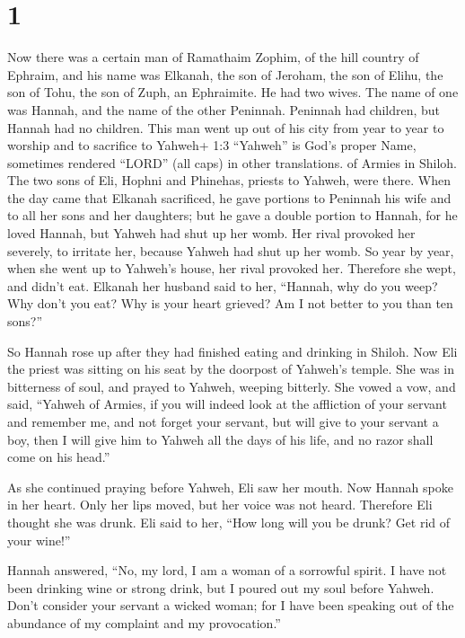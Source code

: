 \hypertarget{section}{%
\section{1}\label{section}}

 Now there was a certain man of Ramathaim Zophim, of the
hill country of Ephraim, and his name was Elkanah, the son of Jeroham,
the son of Elihu, the son of Tohu, the son of Zuph, an Ephraimite.
 He had two wives. The name of one was Hannah, and the name
of the other Peninnah. Peninnah had children, but Hannah had no
children.  This man went up out of his city from year to
year to worship and to sacrifice to Yahweh+ 1:3 ``Yahweh'' is God's
proper Name, sometimes rendered ``LORD'' (all caps) in other
translations. of Armies in Shiloh. The two sons of Eli, Hophni and
Phinehas, priests to Yahweh, were there.  When the day came
that Elkanah sacrificed, he gave portions to Peninnah his wife and to
all her sons and her daughters;  but he gave a double
portion to Hannah, for he loved Hannah, but Yahweh had shut up her womb.
 Her rival provoked her severely, to irritate her, because
Yahweh had shut up her womb.  So year by year, when she went
up to Yahweh's house, her rival provoked her. Therefore she wept, and
didn't eat.  Elkanah her husband said to her, ``Hannah, why
do you weep? Why don't you eat? Why is your heart grieved? Am I not
better to you than ten sons?''

 So Hannah rose up after they had finished eating and
drinking in Shiloh. Now Eli the priest was sitting on his seat by the
doorpost of Yahweh's temple.  She was in bitterness of
soul, and prayed to Yahweh, weeping bitterly.  She vowed a
vow, and said, ``Yahweh of Armies, if you will indeed look at the
affliction of your servant and remember me, and not forget your servant,
but will give to your servant a boy, then I will give him to Yahweh all
the days of his life, and no razor shall come on his head.''

 As she continued praying before Yahweh, Eli saw her mouth.
 Now Hannah spoke in her heart. Only her lips moved, but
her voice was not heard. Therefore Eli thought she was drunk.
 Eli said to her, ``How long will you be drunk? Get rid of
your wine!''

 Hannah answered, ``No, my lord, I am a woman of a
sorrowful spirit. I have not been drinking wine or strong drink, but I
poured out my soul before Yahweh.  Don't consider your
servant a wicked woman; for I have been speaking out of the abundance of
my complaint and my provocation.''

